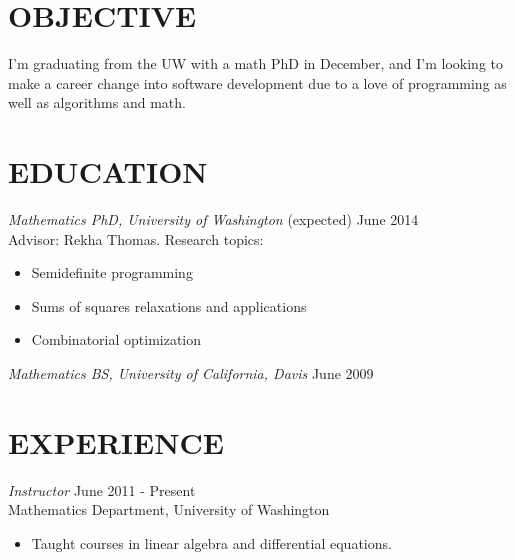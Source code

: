 \documentclass{res}
\begin{document}
 

\address{http://www.math.washington.edu/\textasciitilde jpfeiff/\\jamesrpfeiffer@gmail.com}
\address{142 21st Ave E \#3\\Seattle, WA 98112\\360-616-1403}


                                  
\begin{resume}

\section{OBJECTIVE}          
    I'm graduating from the UW with a math PhD in December, and I'm looking to
    make a career change into software development due to a love of programming as well as algorithms and math.

\section{EDUCATION} {\sl Mathematics PhD, University of Washington} \hfill (expected) June 2014 \\
                Advisor: Rekha Thomas. Research topics:
                 \begin{itemize}  \itemsep -2pt %
                 \item Semidefinite programming
                \item Sums of squares relaxations and applications
                \item Combinatorial optimization
                \end{itemize}
 
                {\sl Mathematics BS, University of California, Davis} \hfill            June 2009 


\section{EXPERIENCE} {\sl Instructor} \hfill June 2011 - Present\\
                Mathematics Department, University of Washington
                 \begin{itemize}  \itemsep -2pt %
                 \item Taught courses in linear algebra and differential equations.
                \end{itemize}
 

\end{resume}
\end{document}
